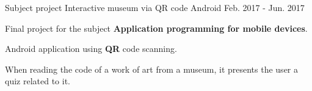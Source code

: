 \begin{cventries}
  \cventry
    {{Subject project}} %
    {Interactive museum via QR code} %
    {Android} %
    {Feb. 2017 - Jun. 2017} %
    {
      \begin{cvitems} %
        \item {Final project for the subject \textbf{Application programming for mobile devices}.}
        \item {Android application using \textbf{QR} code scanning.}
        \item {When reading the code of a work of art from a museum, it presents the user a quiz related to it.}
      \end{cvitems}
    }

\end{cventries}
